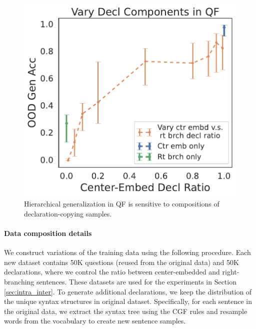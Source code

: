 \begin{figure}
    \vspace{-8px}
    \centering
    \includegraphics[width=0.9\linewidth]{figures/simplicity_contamination.pdf}
    \caption{Hierarchical generalization in QF is sensitive to compositions of declaration-copying samples.} 
    \label{fig:simplicity_contamination}
\end{figure}


\paragraph{Data composition details} We construct variations of the training data using the following procedure. Each new dataset contains 50K questions (reused from the original data) and 50K declarations, where we control the ratio between center-embedded and right-branching sentences. These datasets are used for the experiments in Section \ref{sec:intra_inter}. To generate additional declarations, we keep the distribution of the unique syntax structures in original dataset. Specifically, for each sentence in the original data, we extract the syntax tree using the CGF rules and resample words from the vocabulary to create new sentence samples. 

